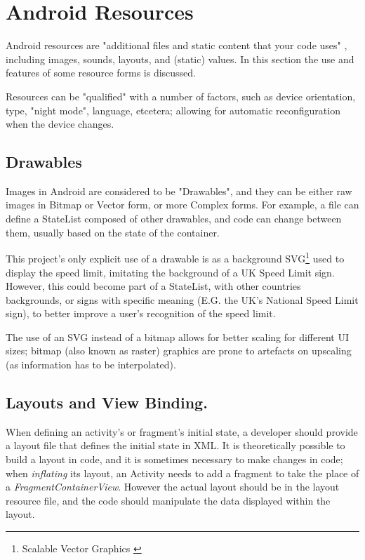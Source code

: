 \documentclass[11pt, a4paper, notitlepage]{report}
\begin{document}
\section{Android Resources}
Android resources are "additional files and static content that your code uses" \citep{resourcesAndroid}, including images, sounds, layouts, and (static) values. In this section the use and features of some resource forms is discussed.

Resources can be "qualified" with a number of factors, such as device orientation, type, "night mode", language, etcetera; allowing for automatic reconfiguration when the device changes.

\subsection{Drawables}
Images in Android are considered to be "Drawables", and they can be either raw images in Bitmap or Vector form, or more Complex forms. For example, a file can define a StateList composed of other drawables, and code can change between them, usually based on the state of the container.

This project's only explicit use of a drawable is as a background SVG\footnote{Scalable Vector Graphics \citep{SVGW3C}} used to display the speed limit, imitating the background of a UK Speed Limit sign. However, this could become part of a StateList, with other countries backgrounds, or signs with specific meaning (E.G. the UK's National Speed Limit sign), to better improve a user's recognition of the speed limit.

The use of an SVG instead of a bitmap allows for better scaling for different UI sizes; bitmap (also known as raster) graphics are prone to artefacts on upscaling (as information has to be interpolated).

\subsection{Layouts and View Binding.}
When defining an activity's or fragment's initial state, a developer should provide a layout file that defines the initial state in XML. It is theoretically possible to build a layout in code, and it is sometimes necessary to make changes in code; when \textit{inflating} its layout, an Activity needs to add a fragment to take the place of a \textit{FragmentContainerView}. However the actual layout should be in the layout resource file, and the code should manipulate the data displayed within the layout.
\end{document}
